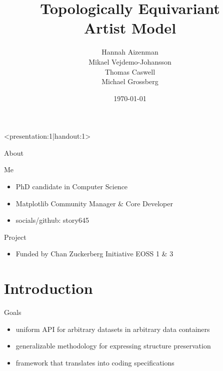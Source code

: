 \documentclass[xcolor={dvipsnames}]{beamer}
\title{Topologically Equivariant \\ Artist Model}
\author{Hannah Aizenman\texorpdfstring{\\}{,}  Mikael Vejdemo-Johansson \texorpdfstring{\\}{,} Thomas Caswell \texorpdfstring{\\}{,} Michael Grossberg}
\institute{Department of Computer Science, The Graduate Center}
\date{\today}
\begin{document}
\begin{frame}<presentation:1|handout:1>
	\titlepage
\end{frame}

\begin{frame}{About}
    \begin{block}{Me}
        \begin{itemize}
            \item PhD candidate in Computer Science
            \item Matplotlib Community Manager \& Core Developer
            \item  socials/github: story645
        \end{itemize}
    \end{block}

    \begin{block}{Project}
        \begin{itemize}
            \item Funded by Chan Zuckerberg Initiative EOSS 1 \& 3
        \end{itemize}
    \end{block}
\end{frame}

\section{Introduction}
\begin{frame}{Goals}
    \begin{itemize}
        \item uniform API for arbitrary datasets in arbitrary data containers
        \item generalizable methodology for expressing structure preservation
        \item framework that translates into coding specifications
    \end{itemize}
\end{frame}
\end{document}
